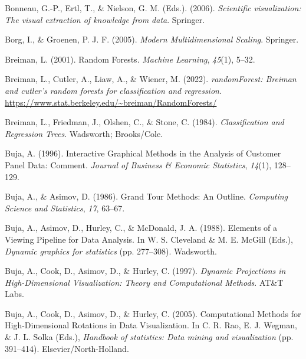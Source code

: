 \documentclass[
  letterpaper,
]{krantz}
\newlength{\cslhangindent}
\newlength{\cslentryspacingunit} %
\newenvironment{CSLReferences}[2] %
 {%
  \setlength{\parindent}{0pt}
  \ifodd #1
  \let\oldpar\par
  \def\par{\hangindent=\cslhangindent\oldpar}
  \fi
  \setlength{\parskip}{#2\cslentryspacingunit}
 }%
 {}
\begin{document}
\begin{CSLReferences}{1}{0}
\leavevmode{}%
Bonneau, G.-P., Ertl, T., \& Nielson, G. M. (Eds.). (2006).
\emph{Scientific visualization: The visual extraction of knowledge from
data}. Springer.

\leavevmode{}%
Borg, I., \& Groenen, P. J. F. (2005). \emph{Modern {M}ultidimensional
{S}caling}. Springer.

\leavevmode{}%
Breiman, L. (2001). Random {F}orests. \emph{Machine Learning},
\emph{45}(1), 5--32.

\leavevmode{}%
Breiman, L., Cutler, A., Liaw, A., \& Wiener, M. (2022).
\emph{randomForest: Breiman and cutler's random forests for
classification and regression}.
\url{https://www.stat.berkeley.edu/~breiman/RandomForests/}

\leavevmode{}%
Breiman, L., Friedman, J., Olshen, C., \& Stone, C. (1984).
\emph{Classification and {R}egression {T}rees}. Wadsworth; Brooks/Cole.

\leavevmode{}%
Buja, A. (1996). Interactive {G}raphical {M}ethods in the {A}nalysis of
{C}ustomer {P}anel {D}ata: {C}omment. \emph{Journal of Business \&
Economic Statistics}, \emph{14}(1), 128--129.

\leavevmode{}%
Buja, A., \& Asimov, D. (1986). {G}rand {T}our {M}ethods: {A}n
{O}utline. \emph{Computing Science and Statistics}, \emph{17}, 63--67.

\leavevmode{}%
Buja, A., Asimov, D., Hurley, C., \& McDonald, J. A. (1988). {E}lements
of a {V}iewing {P}ipeline for {D}ata {A}nalysis. In W. S. Cleveland \&
M. E. McGill (Eds.), \emph{Dynamic graphics for statistics} (pp.
277--308). Wadsworth.

\leavevmode{}%
Buja, A., Cook, D., Asimov, D., \& Hurley, C. (1997). \emph{Dynamic
{P}rojections in {H}igh-{D}imensional {V}isualization: {T}heory and
{C}omputational {M}ethods}. AT\&{T} Labs.

\leavevmode{}%
Buja, A., Cook, D., Asimov, D., \& Hurley, C. (2005). {C}omputational
{M}ethods for {H}igh-{D}imensional {R}otations in {D}ata
{V}isualization. In C. R. Rao, E. J. Wegman, \& J. L. Solka (Eds.),
\emph{Handbook of statistics: Data mining and visualization} (pp.
391--414). Elsevier/North-Holland.


\end{CSLReferences}
\end{document}
